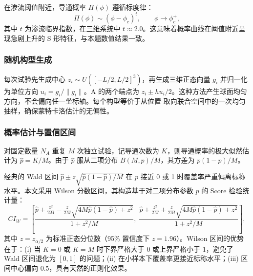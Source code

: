 \documentclass[12pt,a4paper,fontset=windows]{ctexart}
\begin{document}
在渗流阈值附近，导通概率 $\Pi(\phi)$ 遵循标度律\cite{ziff2002}：
\begin{equation}
\Pi(\phi) \sim (\phi - \phi_c)^t, \qquad \phi \to \phi_c^+,
\label{eq:scaling_law}
\end{equation}
其中 $t$ 为渗流临界指数，在三维系统中 $t\approx 2.0$。这意味着概率曲线在阈值附近呈现急剧上升的 S 形特征，与本题数值结果一致。

\subsubsection{随机构型生成}
每次试验先生成中心 $z_i\sim U([-L/2,L/2]^3)$，再生成三维正态向量 $g_i$ 并归一化为单位方向 $u_i=g_i/\|g_i\|$。A 的两个端点为 $z_i\pm hu_i/2$。这种方法产生球面均匀方向，不会偏向任一坐标轴。每个构型等价于从位置-取向联合空间中的一次均匀抽样，确保蒙特卡洛估计的无偏性。

\subsubsection{概率估计与置信区间}
对固定数量 $N_A$ 重复 $M$ 次独立试验，记导通次数为 $K$，则导通概率的极大似然估计为 $\hat p=K/M$。由于 $\hat p$ 服从二项分布 $B(M,p)/M$，其方差为 $p(1-p)/M$。

经典的 Wald 区间 $\hat p\pm z\sqrt{\hat p(1-\hat p)/M}$ 在 $p$ 接近 0 或 1 时覆盖率严重偏离标称水平\cite{brown2001}。本文采用 Wilson 分数区间，其构造基于对二项分布参数 $p$ 的 Score 检验统计量：
\begin{equation}
CI_W = \left[\frac{\hat p + \frac{z^2}{2M} - \frac{z}{2M}\sqrt{4M\hat p(1-\hat p)+z^2}}{1+z^2/M},\;
\frac{\hat p + \frac{z^2}{2M} + \frac{z}{2M}\sqrt{4M\hat p(1-\hat p)+z^2}}{1+z^2/M}\right],
\label{eq:wilson}
\end{equation}
其中 $z=z_{\alpha/2}$ 为标准正态分位数（95\% 置信度下 $z=1.96$）。Wilson 区间的优势在于\cite{brown2001}：(i) 当 $K=0$ 或 $K=M$ 时下界严格大于 0 或上界严格小于 1，避免了 Wald 区间退化为 $[0,1]$ 的问题；(ii) 在小样本下覆盖率更接近标称水平；(iii) 区间中心偏向 $0.5$，具有天然的正则化效果。
\end{document}
